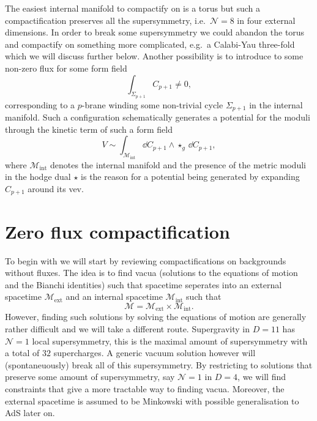 The easiest internal manifold to compactify on is a torus but such a compactification preserves all the supersymmetry, i.e.\ $\mathcal{N}=8$ in four external dimensions. In order to break some supersymmetry we could abandon the torus and compactify on something more complicated, e.g.\ a Calabi-Yau three-fold which we will discuss further below. Another possibility is to introduce to some non-zero flux for some form field 
\begin{equation}
    \int_{\Sigma_{p+1}}C_{p+1}\neq 0,
\end{equation}
corresponding to a $p$-brane winding some non-trivial cycle $\Sigma_{p+1}$ in the internal manifold. Such a configuration schematically generates a potential for the moduli through the kinetic term of such a form field 
\begin{equation}
    V\sim \int_{\mathcal{M}_{\text{int}}} \dd C_{p+1}\wedge \star_{g}\,\dd C_{p+1}, 
\end{equation}
where $\mathcal{M}_\text{int}$ denotes the internal manifold and the presence of the metric moduli in the hodge dual $\star$ is the reason for a potential being generated by expanding $C_{p+1}$ around its vev. 



\section{Zero flux compactification}
To begin with we will start by reviewing compactifications on backgrounds without fluxes. The idea is to find vacua (solutions to the equations of motion and the Bianchi identities) such that spacetime seperates into an external spacetime $\mathcal{M}_{\text{ext}}$ and an internal spacetime $\mathcal{M}_{\text{int}}$ such that 
\begin{equation}
    \mathcal{M} = \mathcal{M}_{\text{ext}}\times \mathcal{M}_{\text{int}}.
\end{equation}
However, finding such solutions by solving the equations of motion are generally rather difficult and we will take a different route. Supergravity in $D=11$ has $\mathcal{N}=1$ local supersymmetry, this is the maximal amount of supersymmetry with a total of $32$ supercharges. A generic vacuum solution however will (spontaneuously) break all of this supersymmetry. By restricting to solutions that preserve some amount of supersymmetry, say $\mathcal{N}=1$ in $D=4$, we will find constraints that give a more tractable way to finding vacua. Moreover, the external spacetime is assumed to be Minkowski with possible generalisation to AdS later on. 

